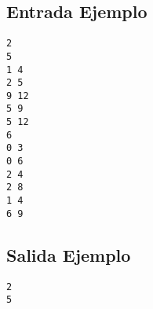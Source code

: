 \begin{multicols}{2}

\subsection*{Entrada Ejemplo}

\begin{verbatim}
2
5
1 4
2 5
9 12
5 9
5 12
6
0 3
0 6
2 4
2 8
1 4
6 9
\end{verbatim}

\columnbreak

\subsection*{Salida Ejemplo}

\begin{verbatim}
2
5
\end{verbatim}

\end{multicols}